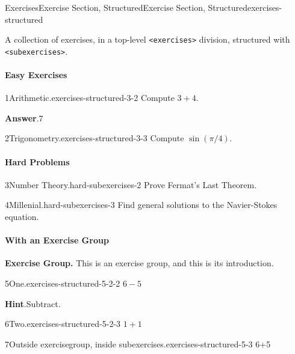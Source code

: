 \documentclass[twoside,10pt,]{article}
\newcommand{\blocktitlefont}{\relax}
\newcommand{\mono}[1]{\texttt{#1}}
\numberwithin{equation}{section}
\begin{document}
\begin{exercises-section}{Exercises}{Exercise Section, Structured}{}{Exercise Section, Structured}{}{}{exercises-structured}
\begin{introduction}{}%
A collection of exercises, in a top-level \mono{<exercises>} division, structured with \mono{<subexercises>}.%
\end{introduction}%
\paragraph{Easy Exercises}\hypertarget{exercises-structured-3}{}
\begin{divisionexercise}{1}{Arithmetic.}{}{exercises-structured-3-2}%
Compute \(3+4\).%
\par\smallskip%
\noindent\textbf{\blocktitlefont Answer}.\hypertarget{exercises-structured-3-2-3}{}\quad{}\(7\)%
\end{divisionexercise}%
\begin{divisionexercise}{2}{Trigonometry.}{}{exercises-structured-3-3}%
Compute \(\sin(\pi/4)\).%
\end{divisionexercise}%
\paragraph{Hard Problems}\hypertarget{hard-subexercises}{}
\begin{divisionexercise}{3}{Number Theory.}{}{hard-subexercises-2}%
Prove Fermat's Last Theorem.%
\end{divisionexercise}%
\begin{divisionexercise}{4}{Millenial.}{}{hard-subexercises-3}%
Find general solutions to the Navier-Stokes equation.%
\end{divisionexercise}%
\paragraph{With an Exercise Group}\hypertarget{exercises-structured-5}{}
\par\medskip\noindent%
\textbf{Exercise Group.}\space\space%
This is an exercise group, and this is its introduction.%
\begin{exercisegroup}
\begin{divisionexerciseeg}{5}{One.}{}{exercises-structured-5-2-2}%
\(6-5\)%
\par\smallskip%
\noindent\textbf{\blocktitlefont Hint}.\hypertarget{exercises-structured-5-2-2-3}{}\quad{}Subtract.%
\end{divisionexerciseeg}%
\begin{divisionexerciseeg}{6}{Two.}{}{exercises-structured-5-2-3}%
\(1+1\)%
\end{divisionexerciseeg}%
\end{exercisegroup}
\par\medskip\noindent
\begin{divisionexercise}{7}{Outside exercisegroup, inside subexercises.}{}{exercises-structured-5-3}%
6+5%
\end{divisionexercise}%
\end{exercises-section}
\end{document}
